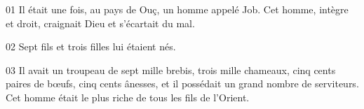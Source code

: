 01 Il était une fois, au pays de Ouç, un homme appelé Job. Cet homme, intègre et droit, craignait Dieu et s’écartait du mal.

02 Sept fils et trois filles lui étaient nés.

03 Il avait un troupeau de sept mille brebis, trois mille chameaux, cinq cents paires de bœufs, cinq cents ânesses, et il possédait un grand nombre de serviteurs. Cet homme était le plus riche de tous les fils de l’Orient.
